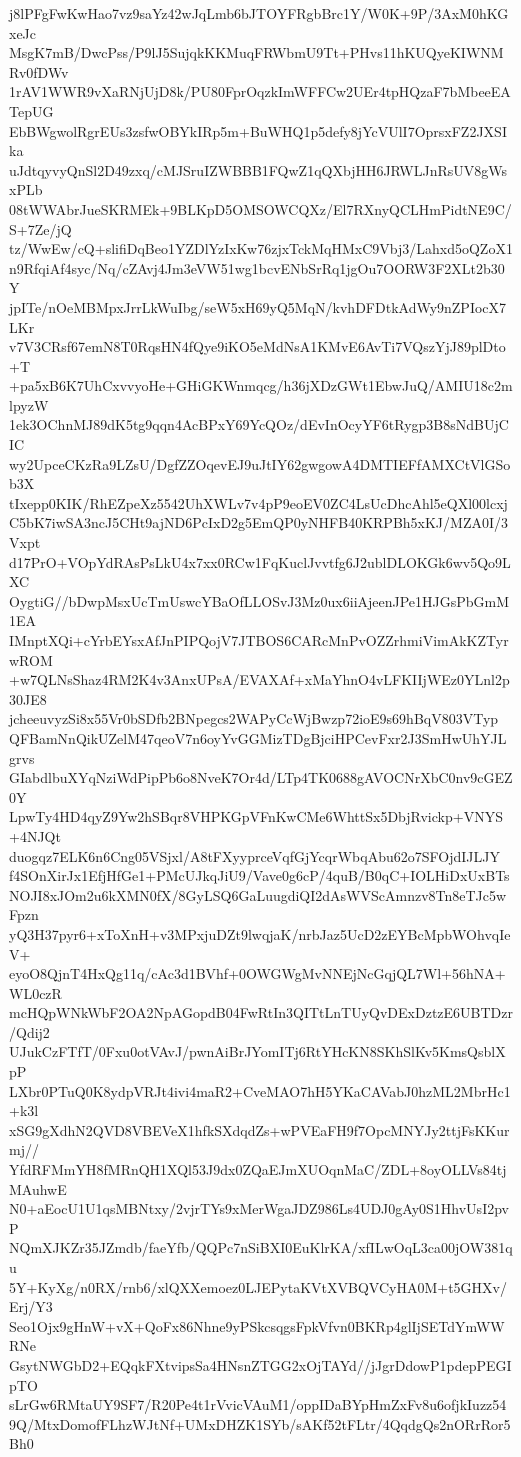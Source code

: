 j8lPFgFwKwHao7vz9saYz42wJqLmb6bJTOYFRgbBrc1Y/W0K+9P/3AxM0hKGxeJc
MsgK7mB/DwcPss/P9lJ5SujqkKKMuqFRWbmU9Tt+PHvs11hKUQyeKIWNMRv0fDWv
1rAV1WWR9vXaRNjUjD8k/PU80FprOqzkImWFFCw2UEr4tpHQzaF7bMbeeEATepUG
EbBWgwolRgrEUs3zsfwOBYkIRp5m+BuWHQ1p5defy8jYcVUlI7OprsxFZ2JXSIka
uJdtqyvyQnSl2D49zxq/cMJSruIZWBBB1FQwZ1qQXbjHH6JRWLJnRsUV8gWsxPLb
08tWWAbrJueSKRMEk+9BLKpD5OMSOWCQXz/El7RXnyQCLHmPidtNE9C/S+7Ze/jQ
tz/WwEw/cQ+slifiDqBeo1YZDlYzIxKw76zjxTckMqHMxC9Vbj3/Lahxd5oQZoX1
n9RfqiAf4syc/Nq/cZAvj4Jm3eVW51wg1bcvENbSrRq1jgOu7OORW3F2XLt2b30Y
jpITe/nOeMBMpxJrrLkWuIbg/seW5xH69yQ5MqN/kvhDFDtkAdWy9nZPIocX7LKr
v7V3CRsf67emN8T0RqsHN4fQye9iKO5eMdNsA1KMvE6AvTi7VQszYjJ89plDto+T
+pa5xB6K7UhCxvvyoHe+GHiGKWnmqcg/h36jXDzGWt1EbwJuQ/AMIU18c2mlpyzW
1ek3OChnMJ89dK5tg9qqn4AcBPxY69YcQOz/dEvInOcyYF6tRygp3B8sNdBUjCIC
wy2UpceCKzRa9LZsU/DgfZZOqevEJ9uJtIY62gwgowA4DMTIEFfAMXCtVlGSob3X
tIxepp0KIK/RhEZpeXz5542UhXWLv7v4pP9eoEV0ZC4LsUcDhcAhl5eQXl00lcxj
C5bK7iwSA3ncJ5CHt9ajND6PcIxD2g5EmQP0yNHFB40KRPBh5xKJ/MZA0I/3Vxpt
d17PrO+VOpYdRAsPsLkU4x7xx0RCw1FqKuclJvvtfg6J2ublDLOKGk6wv5Qo9LXC
OygtiG//bDwpMsxUcTmUswcYBaOfLLOSvJ3Mz0ux6iiAjeenJPe1HJGsPbGmM1EA
IMnptXQi+cYrbEYsxAfJnPIPQojV7JTBOS6CARcMnPvOZZrhmiVimAkKZTyrwROM
+w7QLNsShaz4RM2K4v3AnxUPsA/EVAXAf+xMaYhnO4vLFKIIjWEz0YLnl2p30JE8
jcheeuvyzSi8x55Vr0bSDfb2BNpegcs2WAPyCcWjBwzp72ioE9s69hBqV803VTyp
QFBamNnQikUZelM47qeoV7n6oyYvGGMizTDgBjciHPCevFxr2J3SmHwUhYJLgrvs
GIabdlbuXYqNziWdPipPb6o8NveK7Or4d/LTp4TK0688gAVOCNrXbC0nv9cGEZ0Y
LpwTy4HD4qyZ9Yw2hSBqr8VHPKGpVFnKwCMe6WhttSx5DbjRvickp+VNYS+4NJQt
duogqz7ELK6n6Cng05VSjxl/A8tFXyyprceVqfGjYcqrWbqAbu62o7SFOjdIJLJY
f4SOnXirJx1EfjHfGe1+PMcUJkqJiU9/Vave0g6cP/4quB/B0qC+IOLHiDxUxBTs
NOJI8xJOm2u6kXMN0fX/8GyLSQ6GaLuugdiQI2dAsWVScAmnzv8Tn8eTJc5wFpzn
yQ3H37pyr6+xToXnH+v3MPxjuDZt9lwqjaK/nrbJaz5UcD2zEYBcMpbWOhvqIeV+
eyoO8QjnT4HxQg11q/cAc3d1BVhf+0OWGWgMvNNEjNcGqjQL7Wl+56hNA+WL0czR
mcHQpWNkWbF2OA2NpAGopdB04FwRtIn3QITtLnTUyQvDExDztzE6UBTDzr/Qdij2
UJukCzFTfT/0Fxu0otVAvJ/pwnAiBrJYomITj6RtYHcKN8SKhSlKv5KmsQsblXpP
LXbr0PTuQ0K8ydpVRJt4ivi4maR2+CveMAO7hH5YKaCAVabJ0hzML2MbrHc1+k3l
xSG9gXdhN2QVD8VBEVeX1hfkSXdqdZs+wPVEaFH9f7OpcMNYJy2ttjFsKKurmj//
YfdRFMmYH8fMRnQH1XQl53J9dx0ZQaEJmXUOqnMaC/ZDL+8oyOLLVs84tjMAuhwE
N0+aEocU1U1qsMBNtxy/2vjrTYs9xMerWgaJDZ986Ls4UDJ0gAy0S1HhvUsI2pvP
NQmXJKZr35JZmdb/faeYfb/QQPc7nSiBXI0EuKlrKA/xfILwOqL3ca00jOW381qu
5Y+KyXg/n0RX/rnb6/xlQXXemoez0LJEPytaKVtXVBQVCyHA0M+t5GHXv/Erj/Y3
Seo1Ojx9gHnW+vX+QoFx86Nhne9yPSkcsqgsFpkVfvn0BKRp4glIjSETdYmWWRNe
GsytNWGbD2+EQqkFXtvipsSa4HNsnZTGG2xOjTAYd//jJgrDdowP1pdepPEGIpTO
sLrGw6RMtaUY9SF7/R20Pe4t1rVvicVAuM1/oppIDaBYpHmZxFv8u6ofjkIuzz54
9Q/MtxDomofFLhzWJtNf+UMxDHZK1SYb/sAKf52tFLtr/4QqdgQs2nORrRor5Bh0
